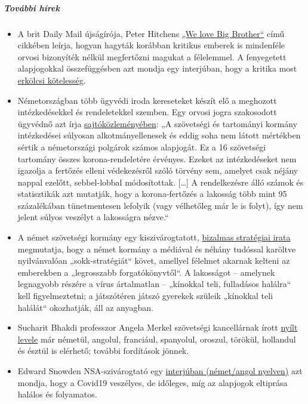 \hypertarget{tovuxe1bbi-huxedrek-1}{%
\subparagraph{\texorpdfstring{\textbf{További
hírek}}{További hírek}}\label{tovuxe1bbi-huxedrek-1}}

\begin{itemize}
\tightlist
\item
  A brit Daily Mail újságírója, Peter Hitchens
  \href{https://www.firstthings.com/web-exclusives/2020/04/we-love-big-brother}{„We
  love Big Brother``} című cikkében leírja, hogyan hagyták korábban
  kritikus emberek is mindenféle orvosi bizonyíték nélkül megfertőzni
  magukat a félelemmel. A fenyegetett alapjogokkal összefüggésben azt
  mondja egy interjúban, hogy a kritika most
  \href{https://www.spiked-online.com/podcast-episode/in-this-lockdown-dissent-is-a-moral-duty/}{erkölcsi
  kötelesség}.
\item
  Németországban több ügyvédi iroda kereseteket készít elő a meghozott
  intézkedésekkel és rendeletekkel szemben. Egy orvosi jogra szakosodott
  ügyvédnő azt írja
  \href{http://beatebahner.de/lib.medien/aktualisierte\%20Pressemitteilung.pdf}{sajtóközleményében}:
  „A szövetségi és tartományi kormány intézkedései súlyosan
  alkotmányellenesek és eddig soha nem látott mértékben sértik a
  németországi polgárok számos alapjogát. Ez a 16 szövetségi tartomány
  összes korona-rendeletére érvényes. Ezeket az intézkedéseket nem
  igazolja a fertőzés elleni védekezésről szóló törvény sem, amelyet
  csak néjány nappal ezelőtt, sebbel-lobbal módosítottak. {[}\ldots{}{]}
  A rendelkezésre álló számok és statisztikák azt mutatják, hogy a
  korona-fertőzés a lakosság több mint 95 százalékában tünetmentesen
  lefolyik (vagy vélhetőleg már le is folyt), így nem jelent súlyos
  veszélyt a lakosságra nézve.``
\item
  A német szövetségi kormány egy kiszivárogtatott,
  \href{https://fragdenstaat.de/dokumente/4123-wie-wir-covid-19-unter-kontrolle-bekommen/}{bizalmas
  stratégiai irata} megmutatja, hogy a német kormány a médiával és
  néhány tudóssal karöltve nyilvánvalóan „sokk-stratégiát`` követ,
  amellyel félelmet akarnak kelteni az emberekben a „legrosszabb
  forgatókönyvtől``. A lakosságot -- amelynek legnagyobb részére a vírus
  ártalmatlan -- „kínokkal teli, fulladásos halálra`` kell
  figyelmeztetni; a játszótéren játszó gyerekek szüleik „kínokkal teli
  halálát`` okozhatják, áll az anyagban.
\item
  Sucharit Bhakdi professzor Angela Merkel szövetségi kancellárnak írott
  \href{https://swprs.org/offener-brief-von-professor-sucharit-bhakdi-an-bundeskanzlerin-dr-angela-merkel/}{nyílt
  levele} már németül, angolul, franciául, spanyolul, oroszul, törökül,
  hollandul és észtül is elérhető; további fordítások jönnek.
\item
  Edward Snowden NSA-szivárogtató egy
  \href{https://www.youtube.com/watch?v=-pcQFTzck_c}{interjúban
  (német/angol nyelven)} azt mondja, hogy a Covid19 veszélyes, de
  időleges, míg az alapjogok eltiprása halálos és folyamatos.
\end{itemize}

